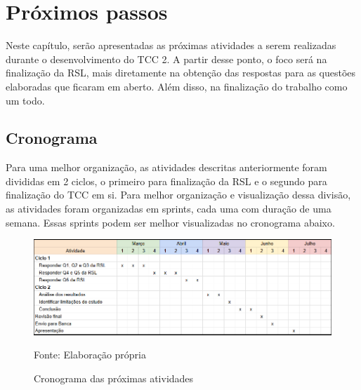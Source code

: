 \chapter[Próximos passos]{Próximos passos}

Neste capítulo, serão apresentadas as próximas atividades a serem realizadas durante o desenvolvimento do TCC 2. A partir desse ponto, o foco será na finalização da RSL, mais diretamente na obtenção das respostas para as questões elaboradas que ficaram em aberto. Além disso, na finalização do trabalho como um todo.

\section{Cronograma}

Para uma melhor organização, as atividades descritas anteriormente foram divididas em 2 ciclos, o primeiro para finalização da RSL e o segundo para finalização do TCC em si. Para melhor organização e visualização dessa divisão, as atividades foram organizadas em sprints, cada uma com duração de uma semana. Essas sprints podem ser melhor visualizadas no cronograma abaixo.

\begin{figure}[h]
	\centering %
	\includegraphics[width=16cm]{figuras/cronograma-tcc-2.png} %
	\caption{Cronograma das próximas atividades}
	Fonte: Elaboração própria
	\label{figura:cronograma-tcc2}
\end{figure}
